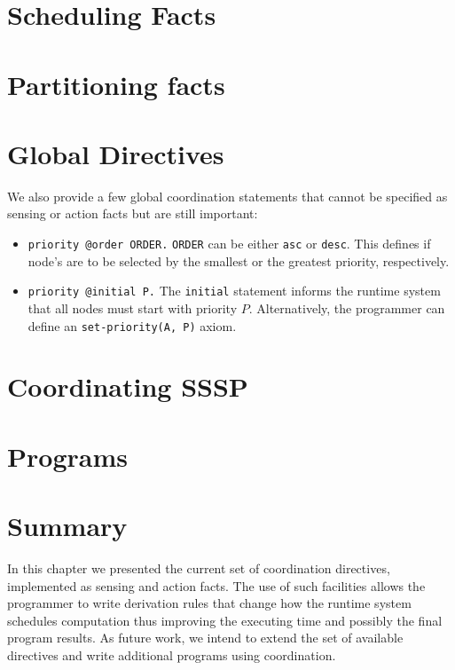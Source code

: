 

\section{Scheduling Facts}\label{sec:fifo}



\section{Partitioning facts}



\section{Global Directives}

We also provide a few global coordination statements that cannot be specified
as sensing or action facts but are still important:

\begin{itemize}

   \item \texttt{priority @order ORDER.} \texttt{ORDER} can be either
      \texttt{asc} or \texttt{desc}. This defines if node's are to be selected
      by the smallest or the greatest priority, respectively.

   \item \texttt{priority @initial P.} The \texttt{initial} statement informs
      the runtime system that all nodes must start with priority $P$.
      Alternatively, the programmer can define an \texttt{set-priority(A, P)}
      axiom.

\end{itemize}

\section{Coordinating SSSP}



\section{Programs}



\section{Summary}

In this chapter we presented the current set of coordination directives,
implemented as sensing and action facts. The use of such facilities allows the
programmer to write derivation rules that change how the runtime system
schedules computation thus improving the executing time and possibly the final
program results. As future work, we intend to extend the set of available
directives and write additional programs using coordination.
